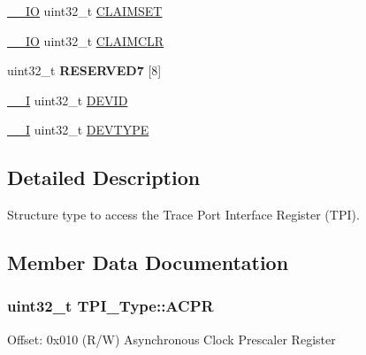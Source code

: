\begin{DoxyCompactItemize}
\item 
\hyperlink{core__sc300_8h_aec43007d9998a0a0e01faede4133d6be}{\+\_\+\+\_\+\+IO} uint32\+\_\+t \hyperlink{struct_t_p_i___type_a2e4d5a07fabd771fa942a171230a0a84}{C\+L\+A\+I\+M\+S\+ET}
\item 
\hyperlink{core__sc300_8h_aec43007d9998a0a0e01faede4133d6be}{\+\_\+\+\_\+\+IO} uint32\+\_\+t \hyperlink{struct_t_p_i___type_a44efa6045512c8d4da64b0623f7a43ad}{C\+L\+A\+I\+M\+C\+LR}
\item 
uint32\+\_\+t {\bfseries R\+E\+S\+E\+R\+V\+E\+D7} \mbox{[}8\mbox{]}\hypertarget{struct_t_p_i___type_a58e6780b937267874964fb3efa9b96c7}{}\label{struct_t_p_i___type_a58e6780b937267874964fb3efa9b96c7}

\item 
\hyperlink{core__sc300_8h_af63697ed9952cc71e1225efe205f6cd3}{\+\_\+\+\_\+I} uint32\+\_\+t \hyperlink{struct_t_p_i___type_a4b2e0d680cf7e26728ca8966363a938d}{D\+E\+V\+ID}
\item 
\hyperlink{core__sc300_8h_af63697ed9952cc71e1225efe205f6cd3}{\+\_\+\+\_\+I} uint32\+\_\+t \hyperlink{struct_t_p_i___type_a16d12c5b1e12f764fa3ec4a51c5f0f35}{D\+E\+V\+T\+Y\+PE}
\end{DoxyCompactItemize}


\subsection{Detailed Description}
Structure type to access the Trace Port Interface Register (T\+PI). 

\subsection{Member Data Documentation}
\subsubsection[{\texorpdfstring{A\+C\+PR}{ACPR}}]{ uint32\+\_\+t T\+P\+I\+\_\+\+Type\+::\+A\+C\+PR}\hypertarget{struct_t_p_i___type_ad75832a669eb121f6fce3c28d36b7fab}{}\label{struct_t_p_i___type_ad75832a669eb121f6fce3c28d36b7fab}
Offset\+: 0x010 (R/W) Asynchronous Clock Prescaler Register 
